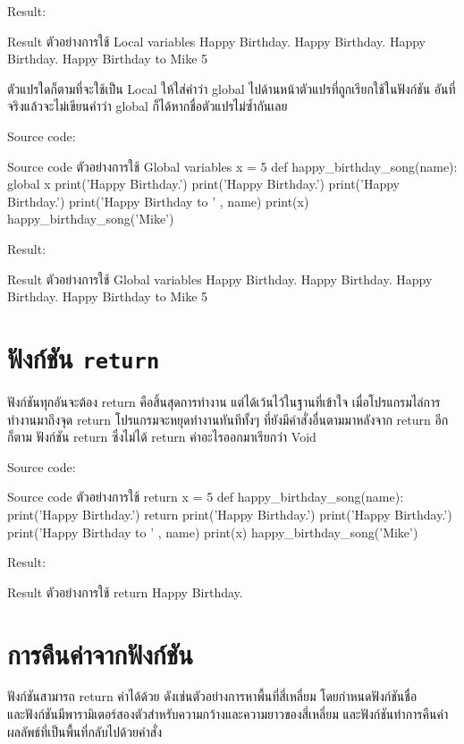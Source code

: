 Result:
\begin{codelist}{Result ตัวอย่างการใช้ Local variables}{}
Happy Birthday.
Happy Birthday.
Happy Birthday.
Happy Birthday to Mike
5
\end{codelist}


ตัวแปรใดก็ตามที่จะใช้เป็น Local ให้ใส่คำว่า global ไปด้านหน้าตัวแปรที่ถูกเรียกใช้ในฟังก์ชัน อันที่จริงแล้วจะไม่เขียนคำว่า global ก็ได้หากชื่อตัวแปรไม่ซ้ำกันเลย

Source code:
\begin{codelist}{Source code ตัวอย่างการใช้ Global variables}{}
x = 5
def happy_birthday_song(name):
    global x
    print('Happy Birthday.')
    print('Happy Birthday.')
    print('Happy Birthday.')
    print('Happy Birthday to ' , name)
    print(x)
happy_birthday_song('Mike')
\end{codelist}

Result:
\begin{codelist}{Result ตัวอย่างการใช้ Global variables}{}
Happy Birthday.
Happy Birthday.
Happy Birthday.
Happy Birthday to Mike
5
\end{codelist}

\section{ฟังก์ชัน \texttt{return}}

ฟังก์ชันทุกอันจะต้อง return คือสิ้นสุดการทำงาน แต่ได้เว้นไว้ในฐานที่เข้าใจ เมื่อโปรแกรมไล่การทำงานมาถึงจุด return โปรแกรมจะหยุดทำงานทันทีทั้งๆ ที่ยังมีคำสั่งอื่นตามมาหลังจาก return อีกก็ตาม  ฟังก์ชัน return ซึ่งไม่ได้ return ค่าอะไรออกมาเรียกว่า Void 

Source code:
\begin{codelist}{Source code ตัวอย่างการใช้ return}{}
x = 5
def happy_birthday_song(name):
    print('Happy Birthday.')
    return
    print('Happy Birthday.')
    print('Happy Birthday.')
    print('Happy Birthday to ' , name)
    print(x)
happy_birthday_song('Mike')
\end{codelist}

Result:
\begin{codelist}{Result ตัวอย่างการใช้ return}{}
Happy Birthday.
\end{codelist}

\section{การคืนค่าจากฟังก์ชัน}

ฟังก์ชันสามารถ return ค่าได้ด้วย ดังเช่นตัวอย่างการหาพื้นที่สี่เหลี่ยม โดยกำหนดฟังก์ชันชื่อ \\   และฟังก์ชันมีพารามิเตอร์สองตัวสำหรับความกว้างและความยาวของสี่เหลี่ยม และฟังก์ชันทำการคืนค่า ผลลัพธ์ที่เป็นพื้นที่กลับไปด้วยคำสั่ง 

